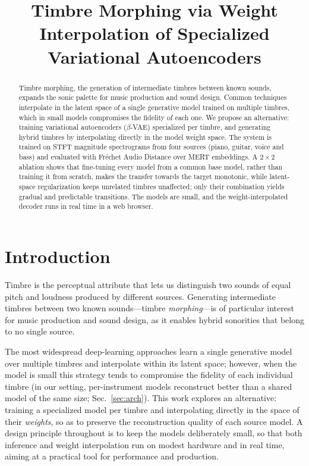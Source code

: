 \documentclass{article}
\title{Timbre Morphing via Weight Interpolation of Specialized Variational Autoencoders}
\begin{document}
%
\maketitle
%
\begin{abstract}
Timbre morphing, the generation of intermediate timbres between known sounds,
expands the sonic palette for music production and sound design. Common
techniques interpolate in the latent space of a single generative model trained
on multiple timbres, which in small models compromises the fidelity of each one.
We propose an alternative: training variational autoencoders ($\beta$-VAE)
specialized per timbre, and generating hybrid timbres by interpolating directly
in the model weight space. The system is trained on STFT magnitude spectrograms
from four sources (piano, guitar, voice and bass) and evaluated with Fr\'echet
Audio Distance over MERT embeddings. A $2\times2$ ablation shows that
fine-tuning every model from a common base model, rather than training it from
scratch, makes the transfer towards the target monotonic, while latent-space
regularization keeps unrelated timbres unaffected; only their combination yields
gradual and predictable transitions. The models are small, and the
weight-interpolated decoder runs in real time in a web browser.
\end{abstract}
%
\section{Introduction}\label{sec:introduction}

Timbre is the perceptual attribute that lets us distinguish two sounds of equal
pitch and loudness produced by different sources. Generating intermediate
timbres between two known sounds---timbre \emph{morphing}---is of particular
interest for music production and sound design, as it enables hybrid sonorities
that belong to no single source.

The most widespread deep-learning approaches learn a single generative model
over multiple timbres and interpolate within its latent space; however, when the
model is small this strategy tends to compromise the fidelity of each
individual timbre (in our setting, per-instrument models reconstruct better than
a shared model of the same size; Sec.~\ref{sec:arch}). This work explores an
alternative: training a specialized model per timbre and interpolating directly
in the space of their \emph{weights}, so as to preserve the reconstruction
quality of each source model. A design principle throughout is to keep the
models deliberately small, so that both inference and weight interpolation run
on modest hardware and in real time, aiming at a practical tool for performance
and production.
\end{document}
